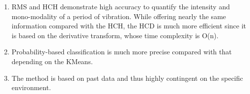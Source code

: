 \documentclass[preprint, 3p, times, compress, 11pt]{elsarticle}
\begin{document}
\begin{enumerate}[(1)]
    \item 
RMS and HCH demonstrate high accuracy to quantify the intensity 
and mono-modality of a period of vibration. While offering nearly the 
same information compared with the HCH, the HCD is much more efficient 
since it is based on the derivative transform, whose time complexity is O(n).
    \item
Probability-based classification is much more precise compared with that 
depending on the KMeans.
    \item 
The method is based on past data and thus highly contingent on the specific 
environment.
\end{enumerate}


\end{document}
